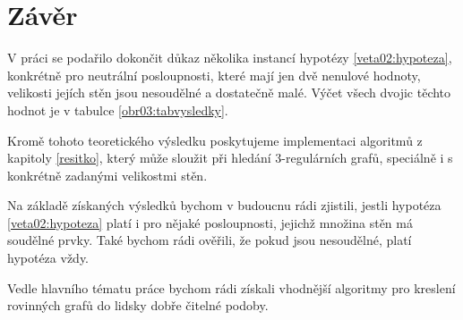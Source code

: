 \chapter*{Závěr}
V práci se podařilo dokončit důkaz několika instancí hypotézy \ref{veta02:hypoteza}, konkrétně pro neutrální posloupnosti, které mají jen dvě nenulové hodnoty, velikosti jejích stěn jsou nesoudělné a dostatečně malé. Výčet všech dvojic těchto hodnot je v tabulce \ref{obr03:tabvysledky}.

Kromě tohoto teoretického výsledku poskytujeme implementaci algoritmů z kapitoly \ref{resitko}, který může sloužit při hledání 3-regulárních grafů, speciálně i s konkrétně zadanými velikostmi stěn.

Na základě získaných výsledků bychom v budoucnu rádi zjistili, jestli hypotéza \ref{veta02:hypoteza} platí i pro nějaké posloupnosti, jejichž množina stěn má soudělné prvky. Také bychom rádi ověřili, že pokud jsou nesoudělné, platí hypotéza vždy.

Vedle hlavního tématu práce bychom rádi získali vhodnější algoritmy pro kreslení rovinných grafů do lidsky dobře čitelné podoby.